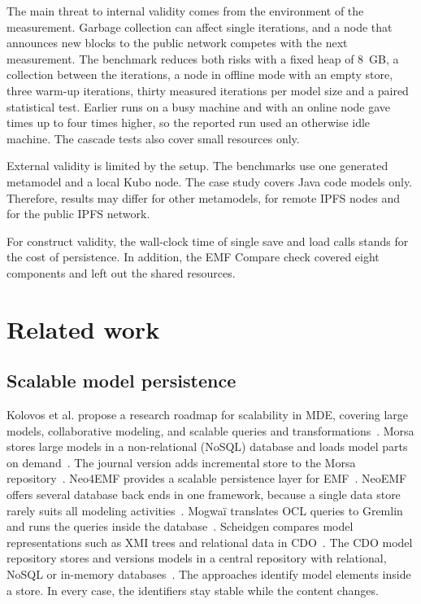 \documentclass[iicol,pdflatex,sn-mathphys-num]{sn-jnl}
\theoremstyle{thmstylethree}%
\begin{document}
The main threat to internal validity comes from the environment of the measurement. Garbage collection can affect single iterations, and a node that announces new blocks to the public network competes with the next measurement. The benchmark reduces both risks with a fixed heap of 8~GB, a collection between the iterations, a node in offline mode with an empty store, three warm-up iterations, thirty measured iterations per model size and a paired statistical test. Earlier runs on a busy machine and with an online node gave times up to four times higher, so the reported run used an otherwise idle machine. The cascade tests also cover small resources only.

External validity is limited by the setup. The benchmarks use one generated metamodel and a local Kubo node. The case study covers Java code models only. Therefore, results may differ for other metamodels, for remote IPFS nodes and for the public IPFS network.

For construct validity, the wall-clock time of single save and load calls stands for the cost of persistence. In addition, the EMF Compare check covered eight components and left out the shared resources.

\section{Related work}\label{sec:related}

\subsection{Scalable model persistence}\label{sec:related-persistence}

Kolovos et al. propose a research roadmap for scalability in MDE, covering large models, collaborative modeling, and scalable queries and transformations~\cite{kolovos2013roadmap}. Morsa stores large models in a non-relational (NoSQL) database and loads model parts on demand~\cite{pagan2011morsa}. The journal version adds incremental store to the Morsa repository~\cite{pagan2015repository}. Neo4EMF provides a scalable persistence layer for EMF~\cite{benelallam2014neo4emf}. NeoEMF offers several database back ends in one framework, because a single data store rarely suits all modeling activities~\cite{daniel2017neoemf}. Mogwaï translates OCL queries to Gremlin and runs the queries inside the database~\cite{daniel2016mogwai}. Scheidgen compares model representations such as XMI trees and relational data in CDO~\cite{scheidgen2013reference}. The CDO model repository stores and versions models in a central repository with relational, NoSQL or in-memory databases~\cite{cdo}. The approaches identify model elements inside a store. In every case, the identifiers stay stable while the content changes.
\end{document}
